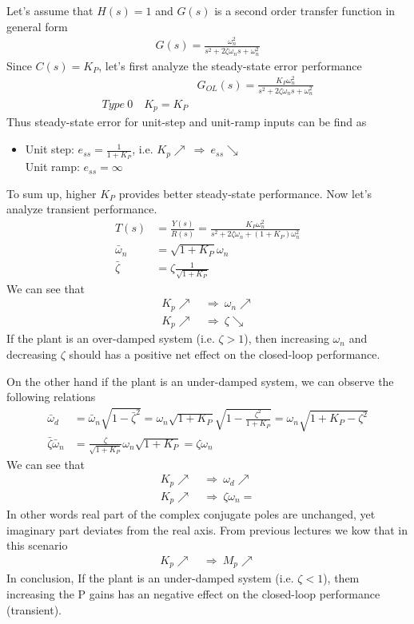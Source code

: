 \documentclass[twoside]{article}
\begin{document}
Let's assume that $H(s) = 1$ and $G(s)$ is a second order
transfer function in general form 
%
  \begin{align*}
  G(s) = \frac{\omega_n^2}{s^2 + 2 \zeta \omega_n s + \omega_n^2}
  \end{align*}
%
Since $C(s) = K_P$, let's first analyze the steady-state error performance
%
\begin{align*}
  &G_{OL}(s) = \frac{K_P \omega_n^2}{s^2 + 2 \zeta \omega_n s +  \omega_n^2}
\\
 Type \ 0 \quad K_p = K_P
\end{align*}
% 
Thus steady-state error for unit-step and unit-ramp inputs can be find
as
\begin{itemize}
\item Unit step: $e_{ss} = \frac{1}{1 + K_P}$, i.e. $K_p \nearrow \
  \Rightarrow \ e_{ss} \searrow$  
\\ Unit ramp: $e_{ss} = \infty$
\end{itemize}
%
To sum up, higher $K_P$ provides better steady-state performance.
Now let's analyze transient performance.
%
%
  \begin{align*}
  T(s) &= \frac{Y(s)}{R(s)} = \frac{K_P \omega_n^2}{s^2 + 2 \zeta
    \omega_n  + (1 + K_P) \omega_n^2}
\\
 \bar{\omega}_n &= \sqrt{1 + K_P} \omega_n
\\
 \bar{\zeta} &= \zeta \frac{1}{ \sqrt{ 1 + K_P} } 
  \end{align*}
%
We can see that
%
  \begin{align*}
    K_p \nearrow \ &\Rightarrow \ \omega_n \nearrow \\
   K_p \nearrow \ &\Rightarrow \ \zeta \searrow  
  \end{align*}
%
If the plant is an over-damped system (i.e. $\zeta > 1$), then increasing
$\omega_n$ and decreasing $\zeta$ should has a positive net 
effect on the closed-loop performance. 

On the other hand if the plant is an under-damped system, 
we can observe the following relations 
%
\begin{align*}
\bar{\omega}_d &= \bar{\omega}_n \sqrt{1 - \bar{\zeta}^2} = \omega_n
  \sqrt{1 + K_P}  \sqrt{1 - \frac{\zeta^2}{ 1 + K_P } } 
  = \omega_n \sqrt{ 1 + K_P -\zeta^2 } 
\\
\bar{\zeta} \bar{\omega}_n &= \frac{\zeta}{ \sqrt{ 1 + K_P } }
                             \omega_n \sqrt{1 + K_P} = \zeta \omega_n
\end{align*}
%
We can see that
%
  \begin{align*}
    K_p \nearrow \ &\Rightarrow \ \omega_d \nearrow \\
   K_p \nearrow \ &\Rightarrow \ \zeta \omega_n \mathrm{=}
  \end{align*}
%
In other words real part of the complex conjugate poles
are unchanged, yet imaginary part deviates from the real 
axis. From previous lectures we kow that in this scenario
%
  \begin{align*}
    K_p \nearrow \ &\Rightarrow \ M_p \nearrow 
  \end{align*}
%
In conclusion, If the plant is an under-damped system (i.e. $\zeta <
1$), them increasing the P gains has an negative effect on 
the closed-loop performance (transient). 
\end{document}

